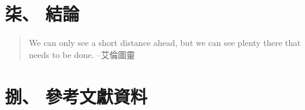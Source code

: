 \documentclass[12pt,a4paper,Times New Roman,UTF8,natbib]{article}
\begin{document}
\begin{CJK*}{UTF8}{bsmi}
	\section{柒、 結論}
	\begin{quote}
		We can only see a short distance ahead, but we can see plenty there that needs to be done.	--艾倫圖靈
	\end{quote}
	\section{捌、 參考文獻資料}

\renewcommand{\refname}{}

\end{CJK*}
\end{document}

